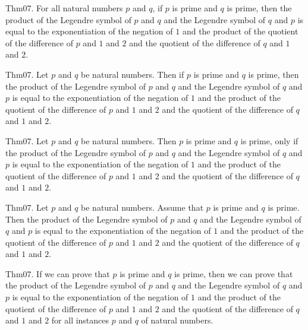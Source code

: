 \documentclass{article}
\begin{document}
Thm07. For all natural numbers $p$ and $q$, if $p$ is prime and $q$ is prime, then the product of the Legendre symbol of $p$ and $q$ and the Legendre symbol of $q$ and $p$ is equal to the exponentiation of the negation of $1$ and the product of the quotient of the difference of $p$ and $1$ and $2$ and the quotient of the difference of $q$ and $1$ and $2$.

Thm07. Let $p$ and $q$ be natural numbers. Then if $p$ is prime and $q$ is prime, then the product of the Legendre symbol of $p$ and $q$ and the Legendre symbol of $q$ and $p$ is equal to the exponentiation of the negation of $1$ and the product of the quotient of the difference of $p$ and $1$ and $2$ and the quotient of the difference of $q$ and $1$ and $2$.

Thm07. Let $p$ and $q$ be natural numbers. Then $p$ is prime and $q$ is prime, only if the product of the Legendre symbol of $p$ and $q$ and the Legendre symbol of $q$ and $p$ is equal to the exponentiation of the negation of $1$ and the product of the quotient of the difference of $p$ and $1$ and $2$ and the quotient of the difference of $q$ and $1$ and $2$.

Thm07. Let $p$ and $q$ be natural numbers. Assume that $p$ is prime and $q$ is prime. Then the product of the Legendre symbol of $p$ and $q$ and the Legendre symbol of $q$ and $p$ is equal to the exponentiation of the negation of $1$ and the product of the quotient of the difference of $p$ and $1$ and $2$ and the quotient of the difference of $q$ and $1$ and $2$.

Thm07. If we can prove that $p$ is prime and $q$ is prime, then we can prove that the product of the Legendre symbol of $p$ and $q$ and the Legendre symbol of $q$ and $p$ is equal to the exponentiation of the negation of $1$ and the product of the quotient of the difference of $p$ and $1$ and $2$ and the quotient of the difference of $q$ and $1$ and $2$ for all instances $p$ and $q$ of natural numbers.
\end{document}

